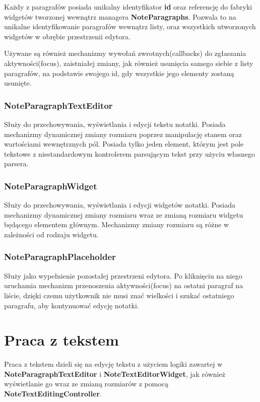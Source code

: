 Każdy z paragrafów posiada unikalny identyfikator \textbf{id} oraz referencję do fabryki widgetów tworzonej wewnątrz managera \textbf{NoteParagraphs}.
Pozwala to na unikalne identyfikowanie paragrafów wewnątrz listy, oraz wszystkich utworzonych widgetów w obrębie przestrzenii edytora.

Używane są również mechanizmy wywołań zwrotnych(callbacks) do zgłaszania aktywności(focus), zaistniałej zmiany, jak również usunięcia samego siebie z listy paragrafów, na podstawie swojego id, gdy wszystkie jego elementy zostaną usunięte.

\subsubsection{NoteParagraphTextEditor}

Służy do przechowywania, wyświetlania i edycji tekstu notatki. Posiada mechanizmy dynamicznej zmiany rozmiaru poprzez manipulację stanem oraz wartościami wewnętrznych pól. Posiada tylko jeden element, którym jest pole tekstowe z niestandardowym kontrolerem parsującym tekst przy użyciu własnego parsera.

\subsubsection{NoteParagraphWidget}

Służy do przechowywania, wyświetlania i edycji widgetów notatki. Posiada mechanizmy dynamicznej zmiany rozmiaru wraz ze zmianą rozmiaru widgetu będącego elementem głównym. Mechanizmy zmiany rozmiaru są różne w zależności od rodzaju widgetu.

\subsubsection{NoteParagraphPlaceholder}

Służy jako wypełnienie pozostałej przestrzeni edytora. Po kliknięciu na niego uruchamia mechanizm przenoszenia aktywności(focus) na ostatni paragraf na liście, dzięki czemu użytkownik nie musi znać wielkości i szukać ostatniego paragrafu, aby kontynuować edycję notatki.

\section{Praca z tekstem}

Praca z tekstem dzieli się na edycję tekstu z użyciem logiki zawartej w \textbf{NoteParagraphTextEditor} i \textbf{NoteTextEditorWidget}, jak również wyświetlanie go wraz ze zmianą rozmiarów z pomocą \textbf{NoteTextEditingController}.

